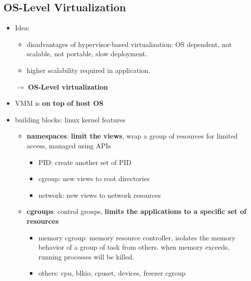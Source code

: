 \subsection{OS-Level Virtualization}
\begin{itemize}
	\item Idea: 
	\begin{itemize}
		\item disadvantages of hypervisor-based virtualization: OS dependent, not scalable, not portable, slow deployment. 
		\item higher scalability required in application.  
	\end{itemize}
	$\rightarrow$ \textbf{OS-Level virtualization}
	\item VMM is \textbf{on top of host OS}
	\item building blocks: linux kernel features
	\begin{itemize}
		\item \textbf{namespaces}: \textbf{limit the views}, wrap a group of resources for limited access, managed using APIs
		\begin{itemize}
			\item PID: create another set of PID
			\item cgroup: new views to root directories
			\item network: new views to network resources
		\end{itemize}
		\item \textbf{cgroups}: control groups, \textbf{limits the applications to a specific set of resources}
		\begin{itemize}
			\item memory cgroup: memory resource controller, isolates the memory behavior of a group of task from others. when memory exceeds, running processes will be killed.
			\item others: cpu, blkio, cpuset, devices, freezer cgroup
		\end{itemize}
		

\end{itemize}
\end{itemize}

